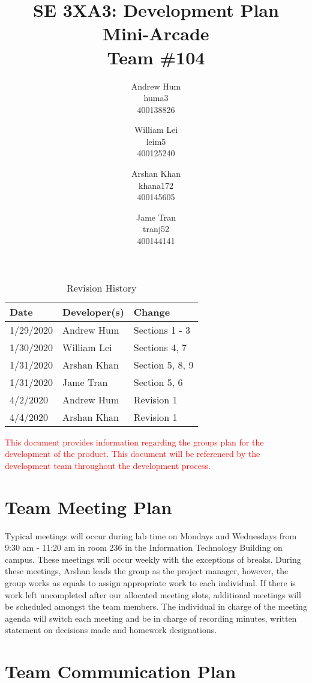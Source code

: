 \documentclass[12pt, titlepage]{article}
\title{SE 3XA3: Development Plan\\Mini-Arcade\\Team \#104}
\author{Andrew Hum \\ huma3 \\ 400138826 \and
		William Lei \\ leim5 \\ 400125240 \and
		Arshan Khan \\ khana172 \\ 400145605 \and
		Jame Tran \\ tranj52 \\ 400144141
}
\date{}
\begin{document}
\maketitle

\begin{table}[hp]
\caption{Revision History} \label{TblRevisionHistory}
\begin{tabularx}{\textwidth}{llX}
\toprule
\textbf{Date} & \textbf{Developer(s)} & \textbf{Change}\\
\midrule
1/29/2020 & Andrew Hum & Sections 1 - 3\\
1/30/2020 & William Lei & Sections 4, 7\\
1/31/2020 & Arshan Khan & Section 5, 8, 9 \\
1/31/2020 & Jame Tran & Section 5, 6 \\
4/2/2020 & Andrew Hum & Revision 1\\
4/4/2020 & Arshan Khan & Revision 1\\

\bottomrule
\end{tabularx}
\end{table}

\newpage

\textcolor{red}{This document provides information regarding the groups plan for the development of the product. This document will be referenced by the development team throughout the development process.}

\section{Team Meeting Plan}

Typical meetings will occur during lab time on Mondays and Wednesdays from 9:30 am - 11:20 am in room 236 in the Information Technology Building on campus. These meetings will occur weekly with the exceptions of breaks. During these meetings, Arshan leads the group as the project manager, however, the group works as equals to assign appropriate work to each individual. If there is work left uncompleted after our allocated meeting slots, additional meetings will be scheduled amongst the team members. The individual in charge of the meeting agenda will switch each meeting and be in charge of recording minutes, written statement on decisions made and homework designations.

\section{Team Communication Plan}
\end{document}
